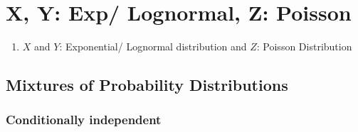 \section{X, Y: Exp/ Lognormal, Z: Poisson}

\begin{enumerate}
    \item $X$ and $Y$: Exponential/ Lognormal distribution and $Z$: Poisson Distribution
    \hfill \cite{statistics/book/Statistics-for-Data-Scientists/Maurits-Kaptein}
\end{enumerate}


\subsection{Mixtures of Probability Distributions}

\subsubsection{Conditionally independent}

